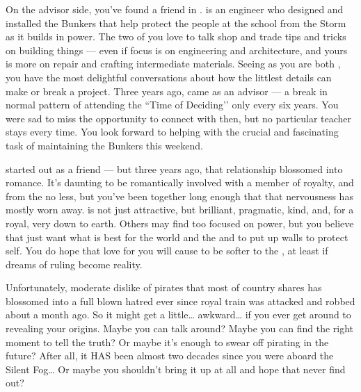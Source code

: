 \documentclass[char]{GL2020}
\begin{document}
On the advisor side, you've found a friend in \cBunker{\full}. \cBunker{} is an engineer who designed and installed the Bunkers that help protect the people at the school from the Storm as it builds in power. The two of you love to talk shop and trade tips and tricks on building things — even if \cBunker{\their} focus is on engineering and architecture, and yours is more on repair and crafting intermediate materials. Seeing as you are both \pShippies{}, you have the most delightful conversations about how the littlest details can make or break a project. Three years ago, \cBunker{} came as an advisor — a break in \cBunker{\their} normal pattern of attending the ``Time of Deciding’’ only every six years. You were sad to miss the opportunity to connect with \cBunker{\them} then, but no particular teacher stays every time. You look forward to helping \cBunker{} with the crucial and fascinating task of maintaining the Bunkers this weekend.

\cPrince{\full} started out as a friend — but three years ago, that relationship blossomed into romance. It's daunting to be romantically involved with a member of royalty, and from the \pFarm{} no less, but you've been together long enough that that nervousness has mostly worn away. \cPrince{} is not just attractive, but brilliant, pragmatic, kind, and, for a royal, very down to earth. Others may find \cPrince{} too focused on power, but you believe that \cPrince{\they} just want\cPrince{\verbs} what is best for the world and the \pFarm{} and \cPrince{\have} to put up walls to protect \cPrince{\them}self. You do hope that \cPrince{\their} love for you will cause \cPrince{\them} to be softer to the \pShip{}, at least if \cPrince{\their} dreams of ruling become reality.  

Unfortunately, \cPrince{\their} moderate dislike of pirates that most of \cPrince{\their} country shares has blossomed into a full blown hatred ever since \cPrince{\their} royal train was attacked and \cPrince{\they} \cPrince{\were} robbed about a month ago. So it might get a little\ldots{} awkward\ldots{} if you ever get around to revealing your origins. Maybe you can talk \cPrince{\them} around? Maybe you can find the right moment to tell \cPrince{\them} the truth? Or maybe it's enough to swear off pirating in the future? After all, it HAS been almost two decades since you were aboard the Silent Fog\ldots{} Or maybe you shouldn't bring it up at all and hope that \cPirate{\they} never find\cPirate{\verbs} out?
\end{document}
